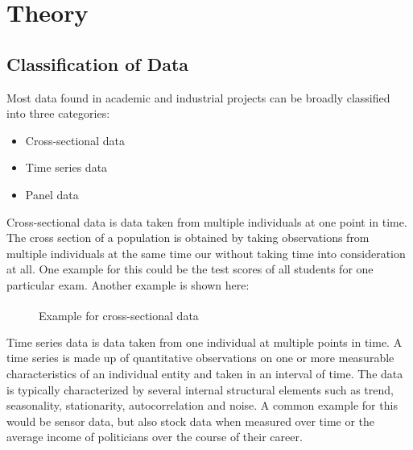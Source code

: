 \chapter{Theory}

\section{Classification of Data}
Most data found in academic and industrial projects can be broadly classified into three categories:
\begin{itemize}
	\item Cross-sectional data
	\item Time series data
	\item Panel data
\end{itemize}

Cross-sectional data is data taken from multiple individuals at one point in time. The cross section of a population is obtained by taking observations from multiple individuals at the same time our without taking time into consideration at all. One example for this could be the test scores of all students for one particular exam. Another example is shown here:

\begin{figure}[ht]
	\centering
	\caption{Example for cross-sectional data \textsuperscript{\cite{-1}}}
\end{figure}


Time series data is data taken from one individual at multiple points in time. A time series is made up of quantitative observations on one or more measurable characteristics of an individual entity and taken in an interval of time. The data is typically characterized by several internal structural elements such as trend, seasonality, stationarity, autocorrelation and noise. A common example for this would be sensor data, but also stock data when measured over time or the average income of politicians over the course of their career.

